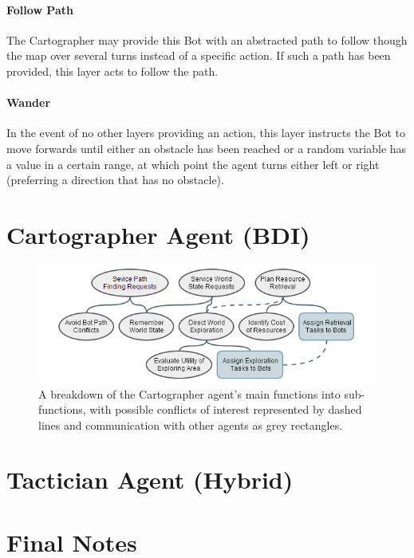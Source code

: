 \documentclass[a4paper,10pt]{article}
\begin{document}
\vspace{-3mm}
\paragraph{Follow Path} The Cartographer may provide this Bot with an abstracted path to follow though the map over several turns instead of a specific action. If such a path has been provided, this layer acts to follow the path.

\vspace{-3mm}
\paragraph{Wander} In the event of no other layers providing an action, this layer instructs the Bot to move forwards until either an obstacle has been reached or a random variable has a value in a certain range, at which point the agent turns either left or right (preferring a direction that has no obstacle).

\section{Cartographer Agent (BDI)}
\begin{figure}[ht]
  \centering
  \includegraphics[width=0.8\linewidth]{cartographer}
  \begin{minipage}[t]{0.8\textwidth}
    \caption{A breakdown of the Cartographer agent's main functions into sub-functions, with possible conflicts of interest represented by dashed lines and communication with other agents as grey rectangles.}
  \end{minipage}
\end{figure}

\section{Tactician Agent (Hybrid)}

\section{Final Notes}
\end{document}
